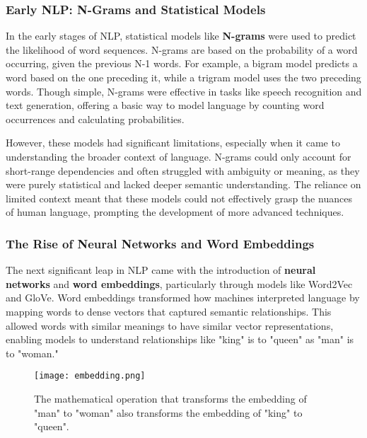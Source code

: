 \subsubsection{ Early NLP: N-Grams and Statistical Models}

In the early stages of NLP, statistical models like \textbf{N-grams} were used to predict the likelihood of word sequences.
N-grams are based on the probability of a word occurring, given the previous N-1 words. For example, a bigram model predicts a word based on the one preceding it, while a trigram model uses the two preceding words. Though simple, N-grams were effective in tasks like speech recognition and text generation, offering a basic way to model language by counting word occurrences and calculating probabilities.

However, these models had significant limitations, especially when it came to understanding the broader context of language.
N-grams could only account for short-range dependencies and often struggled with ambiguity or meaning, as they were purely statistical and lacked deeper semantic understanding.
The reliance on limited context meant that these models could not effectively grasp the nuances of human language, prompting the development of more advanced techniques.

\subsubsection{ The Rise of Neural Networks and Word Embeddings}

The next significant leap in NLP came with the introduction of \textbf{neural networks} and \textbf{word embeddings}, particularly through models like Word2Vec \cite{rong2014word2vec} and GloVe\cite{pennington2014glove}.
Word embeddings transformed how machines interpreted language by mapping words to dense vectors that captured semantic relationships. This allowed words with similar meanings to have similar vector representations, enabling models to understand relationships like "king" is to "queen" as "man" is to "woman."

\begin{figure}[h]
    \centering
    \texttt{[image: embedding.png]}
    \caption{The mathematical operation that transforms the embedding of "man" to "woman" also transforms the embedding of "king" to "queen".}
    \vspace{0.1cm}
    \label{fig:embeddings}
\end{figure}

